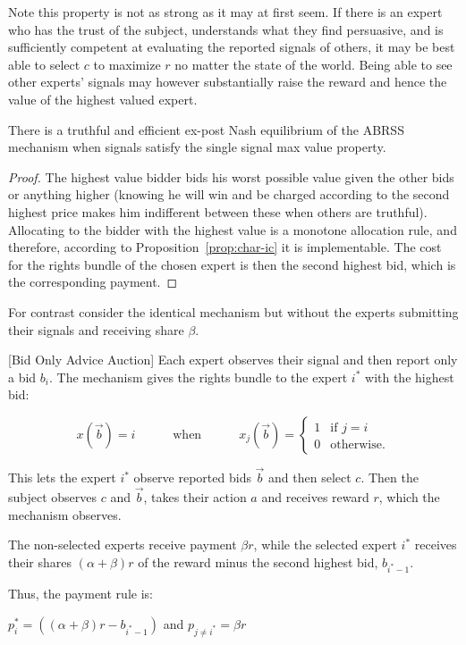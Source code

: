 Note this property is not as strong as it may at first seem. If there is an expert who has the trust of the subject, understands what they find persuasive, and is sufficiently competent at evaluating the reported signals of others, it may be best able to select $c$ to maximize $r$ no matter the state of the world. Being able to see other experts' signals may however substantially raise the reward and hence the value of the highest valued expert.  


\begin{thm}
	There is a truthful and efficient ex-post Nash equilibrium of the ABRSS mechanism when signals satisfy the single signal max value property.
\end{thm}

\begin{proof}
	The highest value bidder bids his worst possible value given the other bids or anything higher (knowing he will win and be charged according to the second highest price makes him indifferent between these when others are truthful).
	Allocating to the bidder with the highest value is a monotone allocation rule, and therefore, according to Proposition~\ref{prop:char-ic} it is implementable. The cost for the rights bundle of the chosen expert is then the second highest bid, which is the corresponding payment.
\end{proof}



For contrast consider the identical mechanism but without the experts submitting their signals and receiving share $\beta$. 
 
\begin{mech}\label{mech:BidOnly}[Bid Only Advice Auction]
 	Each expert observes their signal and then report only a bid $b_i$. The mechanism gives the rights bundle to the expert $i^*$ with the highest bid:
 	
 	$$x(\vec{b}) = i \quad \quad\quad \text{when} \quad\quad\quad x_j(\vec{b}) = \begin{cases} 1 & \text{if } j=i \\ 0 & \text{otherwise.} \end{cases}$$
 	
 	This lets the expert $i^*$ observe reported bids $\vec{b}$ and then select $c$.
 	Then the subject observes $c$ and $\vec{b}$, takes their action $a$ and receives reward $r$, which the mechanism observes. 
 	
 	The non-selected experts receive  payment $\beta r$, while the selected expert $i^*$ receives their shares $(\alpha + \beta) r$ of the reward minus the second highest bid, $b_{i^*-1}$.
 	
 	Thus, the payment rule is:
 	
 	$p_i^*= ((\alpha + \beta)r - b_{i^*-1})$ and $p_{j\neq i^*} = \beta r$
 \end{mech}
 
